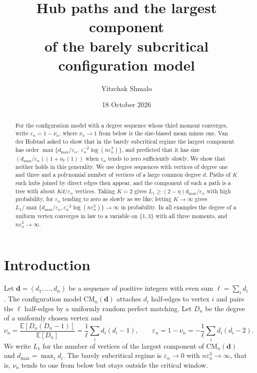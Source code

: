 \documentclass[11pt]{amsart}
\title[Hub paths in the barely subcritical configuration model]{Hub paths and the largest component\\ of the barely subcritical configuration model}
\author{Yitzchak Shmalo}
\date{18 October 2026}
\theoremstyle{definition}
\theoremstyle{remark}
\numberwithin{equation}{section}
\newcommand{\PP}{\mathbb P}
\newcommand{\E}{\mathbb E}
\newcommand{\CM}{\mathrm{CM}}
\newcommand{\eps}{\varepsilon}
\newcommand{\dmax}{d_{\max}}
\begin{document}
\begin{abstract}
For the configuration model with a degree sequence whose third moment converges, write $\eps_n=1-\nu_n$, where $\nu_n\to1$ from below is the size-biased mean minus one. Van der Hofstad asked to show that in the barely subcritical regime the largest component has order $\max\{\dmax/\eps_n,\ \eps_n^{-2}\log(n\eps_n^3)\}$, and predicted that it has size $(\dmax/\eps_n)(1+o_\PP(1))$ when $\eps_n$ tends to zero sufficiently slowly. We show that neither holds in this generality. We use degree sequences with vertices of degree one and three and a polynomial number of vertices of a large common degree $d$. Paths of $K$ such hubs joined by direct edges then appear, and the component of such a path is a tree with about $Kd/\eps_n$ vertices. Taking $K=2$ gives $L_1\ge(2-\eta)\dmax/\eps_n$ with high probability, for $\eps_n$ tending to zero as slowly as we like; letting $K\to\infty$ gives $L_1/\max\{\dmax/\eps_n,\eps_n^{-2}\log(n\eps_n^3)\}\to\infty$ in probability. In all examples the degree of a uniform vertex converges in law to a variable on $\{1,3\}$ with all three moments, and $n\eps_n^3\to\infty$.
\end{abstract}
\maketitle

\section{Introduction}

Let $\mathbf d=(d_1,\dots,d_n)$ be a sequence of positive integers with even sum $\ell=\sum_i d_i$. The configuration model $\CM_n(\mathbf d)$ attaches $d_i$ half-edges to vertex $i$ and pairs the $\ell$ half-edges by a uniformly random perfect matching. Let $D_n$ be the degree of a uniformly chosen vertex and
\[
\nu_n=\frac{\E[D_n(D_n-1)]}{\E[D_n]}=\frac1\ell\sum_{i}d_i(d_i-1),\qquad \eps_n=1-\nu_n=-\frac1\ell\sum_i d_i(d_i-2).
\]
We write $L_1$ for the number of vertices of the largest component of $\CM_n(\mathbf d)$ and $\dmax=\max_i d_i$. The barely subcritical regime is $\eps_n\to0$ with $n\eps_n^3\to\infty$, that is, $\nu_n$ tends to one from below but stays outside the critical window.
\end{document}
